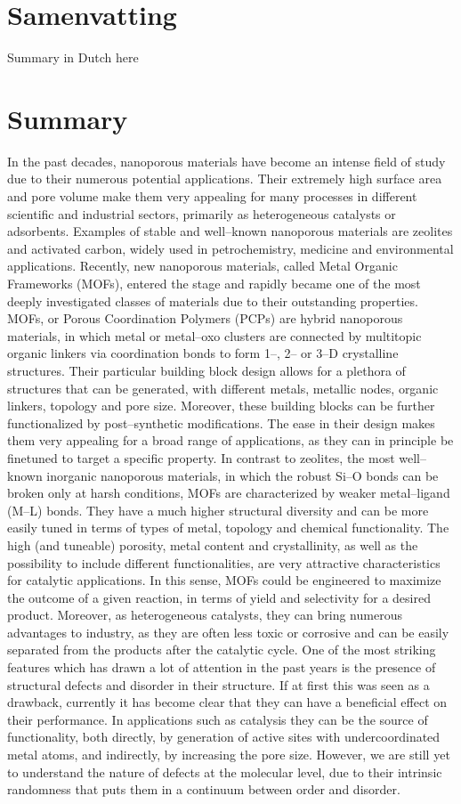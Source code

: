 \chapter{Samenvatting}
Summary in Dutch here

\chapter{Summary}
 In the past decades, nanoporous materials have become an intense field of study due to their numerous potential applications. Their extremely high surface area and pore volume make them very appealing for many processes in different scientific and industrial sectors, primarily as heterogeneous catalysts or adsorbents. Examples of stable and well--known nanoporous materials are zeolites and activated carbon, widely used in petrochemistry, medicine and environmental applications. 
\npar
Recently, new nanoporous materials, called Metal Organic Frameworks (MOFs), entered the stage and rapidly became one of the most deeply investigated classes of materials due to their outstanding properties. MOFs, or Porous Coordination Polymers (PCPs) are hybrid nanoporous materials, in which metal or metal--oxo clusters are connected by multitopic organic linkers via coordination bonds to form 1--, 2-- or 3--D crystalline structures. Their particular building block design allows for a plethora of structures that can be generated, with different metals, metallic nodes, organic linkers, topology and pore size. Moreover, these building blocks can be further functionalized by post--synthetic modifications. The ease in their design makes them very appealing for a broad range of applications, as they can in principle be finetuned to target a specific property. In contrast to zeolites, the most well--known inorganic nanoporous materials, in which the robust Si--O bonds can be broken only at harsh conditions, MOFs are characterized by weaker metal--ligand (M--L) bonds. They have a much higher structural diversity and can be more easily tuned in terms of types of metal, topology and chemical functionality. The high (and tuneable) porosity, metal content and crystallinity, as well as the possibility to include different functionalities, are very attractive characteristics for catalytic applications. In this sense, MOFs could be engineered to maximize the outcome of a given reaction, in terms of yield and selectivity for a desired product. Moreover, as heterogeneous catalysts, they can bring numerous advantages to industry, as they are often less toxic or corrosive and can be easily separated from the products after the catalytic cycle. One of the most striking features which has drawn a lot of attention in the past years is the presence of structural defects and disorder in their structure. If at first this was seen as a drawback, currently it has become clear that they can have a beneficial effect on their performance. In applications such as catalysis they can be the source of functionality, both directly, by generation of active sites with undercoordinated metal atoms, and indirectly, by increasing the pore size. However, we are still yet to understand the nature of defects at the molecular level, due to their intrinsic randomness that puts them in a continuum between order and disorder.
